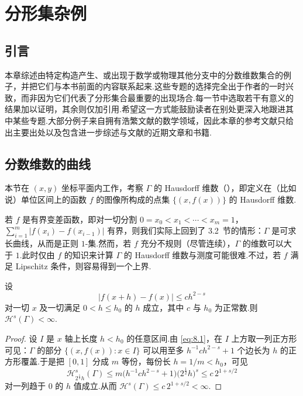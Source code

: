 
\chapter{分形集杂例}\label{chap:8}

\section{引言}

本章综述由特定构造产生、或出现于数学或物理其他分支中的分数维数集合的例子，并把它们与本书前面的内容联系起来.这些专题的选择完全出于作者的一时兴致，而非因为它们代表了分形集合最重要的出现场合.每一节中选取若干有意义的结果加以证明，其余则仅加引用.希望这一方式能鼓励读者在别处更深入地跟进其中某些专题.大部分例子来自拥有浩繁文献的数学领域，因此本章的参考文献只给出主要出处以及包含进一步综述与文献的近期文章和书籍.

\section{分数维数的曲线}

本节在 $(x,y)$ 坐标平面内工作，考察 $\Gamma$ 的 Hausdorff 维数（），即定义在（比如说）单位区间上的函数 $f$ 的图像所构成的点集 $\{(x,f(x))\}$ 的 Hausdorff 维数.

若 $f$ 是有界变差函数，即对一切分割 $0=x_0<x_1<\cdots<x_m=1$，$\sum_{i=1}^{m}|f(x_i)-f(x_{i-1})|$ 有界，则我们实际上回到了 3.2~节的情形：$\Gamma$ 是可求长曲线，从而是正则 $1$-集.然而，若 $f$ 充分不规则（尽管连续），$\Gamma$ 的维数可以大于 $1$.此时仅由 $f$ 的知识来计算 $\Gamma$ 的 Hausdorff 维数与测度可能很难.不过，若 $f$ 满足 Lipschitz 条件，则容易得到一个上界.

\begin{theorem}\label{thm:8.1}
设
\begin{equation}\label{eq:8.1}
  |f(x+h)-f(x)|\leq ch^{2-s}
\end{equation}
对一切 $x$ 及一切满足 $0<h\leq h_0$ 的 $h$ 成立，其中 $c$ 与 $h_0$ 为正常数.则 $\mathcal{H}^s(\Gamma)<\infty$.
\end{theorem}

\begin{proof}
设 $I$ 是 $x$ 轴上长度 $h<h_0$ 的任意区间.由 \eqref{eq:8.1}，在 $I$ 上方取一列正方形可见：$\Gamma$ 的部分 $\{(x,f(x)):x\in I\}$ 可以用至多 $h^{-1}ch^{2-s}+1$ 个边长为 $h$ 的正方形覆盖.于是把 $[0,1]$ 分成 $m$ 等份，每份长 $h=1/m<h_0$，可见
\[
  \mathcal{H}^{s}_{2^{\frac{1}{2}}h}(\Gamma)\leq m\bigl(h^{-1}ch^{2-s}+1\bigr)\bigl(2^{\frac{1}{2}}h\bigr)^{s}\leq c\,2^{1+s/2}
\]
对一列趋于 $0$ 的 $h$ 值成立.从而 $\mathcal{H}^s(\Gamma)\leq c\,2^{1+s/2}<\infty$.
\end{proof}

